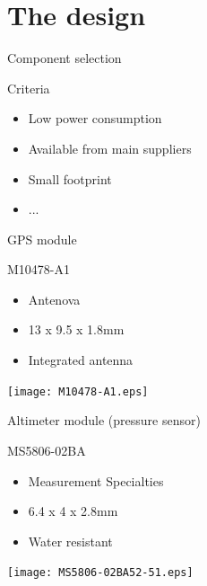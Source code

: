 \documentclass[compress,red]{beamer}
\begin{document}
\section{The design}

\begin{frame}{Component selection}

  \begin{block}{Criteria}
    \begin{itemize}
    \item Low power consumption
    \item Available from main suppliers
    \item Small footprint
    \item ...
    \end{itemize}
  \end{block}

  \note[item]{}

\end{frame}

\begin{frame}{GPS module}

  \begin{block}{M10478-A1}
    \begin{itemize}
    \item Antenova
    \item 13 x 9.5 x 1.8mm
    \item Integrated antenna
    \end{itemize}
  \end{block}

  \begin{center}
    \texttt{[image: M10478-A1.eps]}
  \end{center}

  \note[item]{}

\end{frame}

\begin{frame}{Altimeter module (pressure sensor)}

  \begin{block}{MS5806-02BA}
    \begin{itemize}
    \item Measurement Specialties
    \item 6.4 x 4 x 2.8mm
    \item Water resistant
    \end{itemize}
  \end{block}

  \begin{center}
    \texttt{[image: MS5806-02BA52-51.eps]}
  \end{center}

  \note[item]{}

\end{frame}
\end{document}
